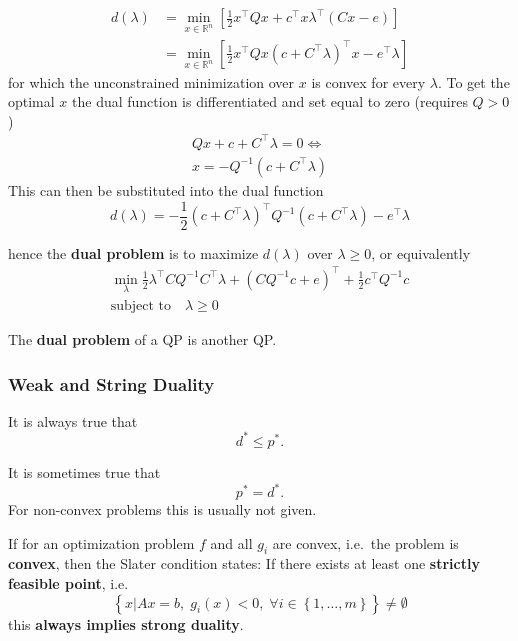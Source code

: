 \begin{align*}
    d(\lambda) & = \min_{x\in\mathbb{R}^n}\left[\frac{1}{2}x^\top Q x + c^\top x \lambda^\top(Cx-e)\right]               \\
               & =  \min_{x\in\mathbb{R}^n}\left[\frac{1}{2}x^\top Q x {(c+C^\top\lambda)}^\top x - e^\top\lambda\right]
\end{align*}
for which the unconstrained minimization over $x$ is convex for every $\lambda$. To get the optimal $x$ the dual function is differentiated and set equal to zero (requires $Q>0$)
\begin{gather*}
    Qx + c +C^\top\lambda=0 \Leftrightarrow \\
    x = -Q^{-1}(c + C^\top\lambda)
\end{gather*}
This can then be substituted into the dual function
\begin{equation*}
    d(\lambda) = -\frac{1}{2}{\left(c+C^\top\lambda\right)}^\top Q^{-1}\left(c+C^\top\lambda\right) -e^\top\lambda
\end{equation*}

hence the \textbf{dual problem} is to maximize $d(\lambda)$ over $\lambda\geq0$, or equivalently
\begin{gather*}
    \min_{\lambda} \frac{1}{2}\lambda^\top C Q^{-1}C^\top\lambda+{\left(CQ^{-1}c+e\right)}^\top + \frac{1}{2}c^\top Q^{-1}c \\
    \text{subject to}\quad \lambda \geq 0
\end{gather*}

The \textbf{dual problem} of a QP is another QP.

\subsubsection{Weak and String Duality}


It is always true that
\begin{equation*}
    d^* \leq p^*.
\end{equation*}

\newpar{}

It is sometimes true that
\begin{equation*}
    p^* = d^*.
\end{equation*}
For non-convex problems this is usually not given.

\newpar{}

If for an optimization problem $f$ and all $g_i$ are convex, i.e.\ the problem is \textbf{convex}, then the Slater condition states:
\newpar{}
If there exists at least one \textbf{strictly feasible point}, i.e.
\begin{equation*}
    \left\{x | Ax = b,\; g_i(x) < 0,\; \forall i \in \left\{1, \ldots, m\right\}\right\} \neq \emptyset
\end{equation*}
this \textbf{always implies strong duality}.

